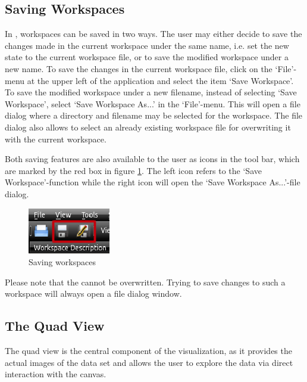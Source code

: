 \subsection{Saving Workspaces}

In \Voreen, workspaces can be saved in two ways. The user may either decide to save the changes made in the current workspace under the same name, i.e. set 
the new state to the current workspace file, or to save the modified workspace under a new name.
To save the changes in the current workspace file, click on the `File'-menu at the upper left of the application  
and select the item `Save Workspace'. 
To save the modified workspace under a new filename, instead of selecting `Save Workspace', select `Save Workspace As...' in the `File'-menu. 
This will open a file dialog where a directory and filename may be selected for the workspace. The file dialog also allows to select an already existing workspace file
for overwriting it with the current workspace.

Both saving features are also available to the user as icons in the tool bar, which are marked by the red box in figure \ref{fig:saving_workspaces}. 
The left icon refers to the `Save Workspace'-function while the right icon will open the `Save Workspace As...'-file dialog.

\begin{figure}[htb]
 \centering
 \includegraphics[scale=1.0,keepaspectratio=true]{./images/saving_workspaces_1.png}
 \caption{Saving workspaces}
 \label{fig:saving_workspaces}
\end{figure}
Please note that the \workspaces cannot be overwritten. Trying to save changes to such a workspace will always open a file dialog window. 

\subsection{The Quad View}
\label{section:quadview}

The quad view is the central component of the \Voreen visualization, as it provides the actual images of the data set and allows the user 
to explore the data via direct interaction with the canvas. 

